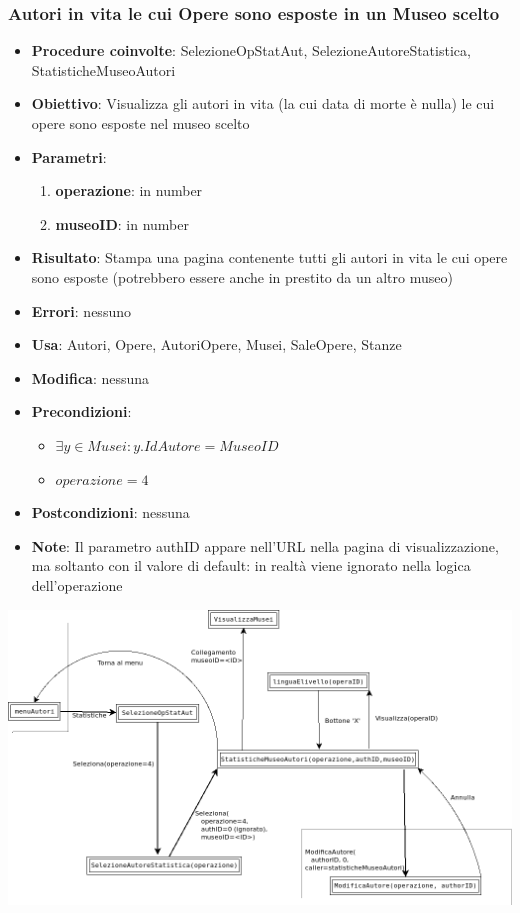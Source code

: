 \subsubsection{Autori in vita le cui Opere sono esposte in un Museo scelto}
\begin{itemize}
	\item \textbf{Procedure coinvolte}: SelezioneOpStatAut, SelezioneAutoreStatistica, 
	StatisticheMuseoAutori
	\item \textbf{Obiettivo}: Visualizza gli autori in vita (la cui data di morte è nulla)
	le cui opere sono esposte nel museo scelto
	\item \textbf{Parametri}:
	\begin{enumerate}
		\item \textbf{operazione}: in number
		\item \textbf{museoID}: in number
	\end{enumerate}
	\item \textbf{Risultato}: Stampa una pagina contenente tutti gli autori in vita
	 le cui opere sono esposte (potrebbero essere anche in prestito da un altro museo) 
	\item \textbf{Errori}: nessuno
	\item \textbf{Usa}: Autori, Opere, AutoriOpere, Musei, SaleOpere, Stanze
	\item \textbf{Modifica}: nessuna
	\item \textbf{Precondizioni}:
	\begin{itemize}
		\item $\exists y \in Musei : y.IdAutore = MuseoID$
		\item $operazione  = 4$
	\end{itemize}
	\item \textbf{Postcondizioni}: nessuna
	\item \textbf{Note}: Il parametro authID appare nell'URL nella pagina di 
	visualizzazione, ma soltanto con il valore di default: in realtà viene ignorato nella 
	logica dell'operazione
\end{itemize}
\includegraphics[width=\textwidth]{img/statAutori-4.png}\\[1cm]

